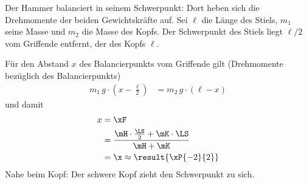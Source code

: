 Der Hammer balanciert in seinem Schwerpunkt: Dort heben sich die Drehmomente der beiden Gewichtskräfte auf. Sei $\ell$ die Länge des Stiels, $m_1$ seine Masse und $m_2$ die Masse des Kopfs. Der Schwerpunkt des Stiels liegt $\ell/2$ vom Griffende entfernt, der des Kopfs $\ell$.

Für den Abstand $x$ des Balancierpunkts vom Griffende gilt (Drehmomente bezüglich des Balancierpunkts)
\begin{align}
 m_1\,g\cdot\left(x-\frac{\ell}{2}\right) &= m_2\,g\cdot(\ell-x)
\end{align}
und damit
\begin{align}
 x &= \xF \\
   &= \frac{\mH\cdot\frac{\LS}{2}+\mK\cdot\LS}{\mH+\mK} \\
   &= \x \approx \result{\xP{-2}{2}}
\end{align}
Nahe beim Kopf: Der schwere Kopf zieht den Schwerpunkt zu sich.

